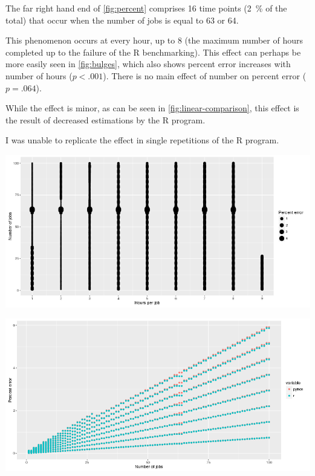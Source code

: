 \documentclass[11pt]{article}
\begin{document}
	\begin{multicols}{2}
		
		The far right hand end of \autoref{fig:percent} comprises 16 time points (\SI{2}{\percent} of the total) that occur when the number of jobs is equal to \num{63} or \num{64}. 
		
		This phenomenon occurs at every hour, up to \num{8} (the maximum number of hours completed up to the failure of the R benchmarking).		
		This effect can perhaps be more easily seen in \autoref{fig:bulges}, which also shows percent error increases with number of hours ($p<.001$). There is no main effect of number on percent error ($p=.064$).
		
		While the effect is minor, as can be seen in \autoref{fig:linear-comparison}, this effect is the result of decreased estimations by the R program.
		
		I was unable to replicate the effect in single repetitions of the R program.
				
	\end{multicols}
	
	\begin{minipage}{0.49\textwidth}
		\centering
		\includegraphics[width=\textwidth]{bulges}
		\label{fig:bulges}
	\end{minipage}	
	\begin{minipage}{0.49\textwidth}
		\centering
		\includegraphics[width=\textwidth]{bad-r}
		\label{fig:linear-comparison}
	\end{minipage}
	
\end{document}
